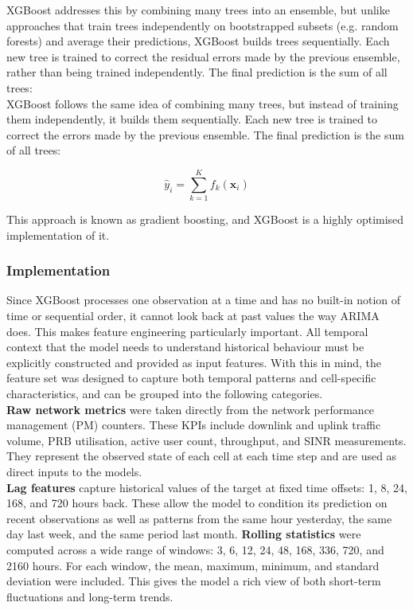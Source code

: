 XGBoost addresses this by combining many trees into an ensemble, but unlike approaches that train trees independently on bootstrapped subsets (e.g. random forests) and average their predictions, XGBoost builds trees sequentially. Each new tree is trained to correct the residual errors made by the previous ensemble, rather than being trained independently. The final prediction is the sum of all trees: \\
 
XGBoost follows the same idea of combining many trees, but instead of training them independently, it builds them sequentially. Each new tree is trained to correct the errors made by the previous ensemble. The final prediction is the sum of all trees: 

\[
\hat{y}_i = \sum_{k=1}^{K} f_k(\mathbf{x}_i)
\]

This approach is known as gradient boosting, and XGBoost is a highly optimised implementation of it. \\

\subsubsection{Implementation}
Since XGBoost processes one observation at a time and has no built-in notion of time or sequential order, it cannot look back at past values the way ARIMA does. This makes feature engineering particularly important. All temporal context that the model needs to understand historical behaviour must be explicitly constructed and provided as input features. With this in mind, the feature set was designed to capture both temporal patterns and cell-specific characteristics, and can be grouped into the following categories. \\

\textbf{Raw network metrics} were taken directly from the network performance management (PM) counters. These KPIs include downlink and uplink traffic volume, PRB utilisation, active user count, throughput, and SINR measurements. They represent the observed state of each cell at each time step and are used as direct inputs to the models. \\

\textbf{Lag features} capture historical values of the target at fixed time offsets: 1, 8, 24, 168, and 720 hours back. These allow the model to condition its prediction on recent observations as well as patterns from the same hour yesterday, the same day last week, and the same period last month.
\textbf{Rolling statistics} were computed across a wide range of windows: 3, 6, 12, 24, 48, 168, 336, 720, and 2160 hours. For each window, the mean, maximum, minimum, and standard deviation were included. This gives the model a rich view of both short-term fluctuations and long-term trends. \\

